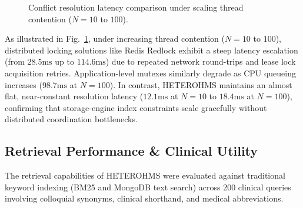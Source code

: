 \documentclass[conference]{IEEEtran}
\begin{document}
\begin{figure}[htbp]
{%
}
\caption{Conflict resolution latency comparison under scaling thread contention ($N = 10$ to $100$).}
\label{fig:concurrency_benchmark}
\end{figure}

As illustrated in Fig.~\ref{fig:concurrency_benchmark}, under increasing thread contention ($N = 10$ to $100$), distributed locking solutions like Redis Redlock exhibit a steep latency escalation (from $28.5\text{ms}$ up to $114.6\text{ms}$) due to repeated network round-trips and lease lock acquisition retries. Application-level mutexes similarly degrade as CPU queueing increases ($98.7\text{ms}$ at $N=100$). In contrast, HETEROHMS maintains an almost flat, near-constant resolution latency ($12.1\text{ms}$ at $N=10$ to $18.4\text{ms}$ at $N=100$), confirming that storage-engine index constraints scale gracefully without distributed coordination bottlenecks.

\subsection{Retrieval Performance \& Clinical Utility}
The retrieval capabilities of HETEROHMS were evaluated against traditional keyword indexing (BM25 and MongoDB text search) across 200 clinical queries involving colloquial synonyms, clinical shorthand, and medical abbreviations.
\end{document}
